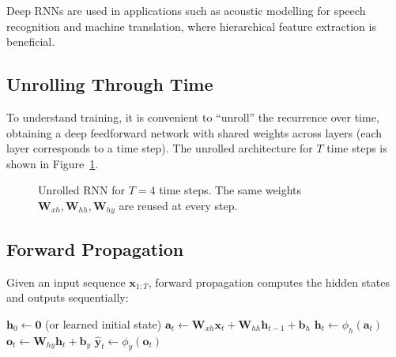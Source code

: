 \documentclass{tufte-handout}
\begin{document}
Deep RNNs are used in applications such as acoustic modelling for speech recognition and machine translation, where hierarchical feature extraction is beneficial.

\subsection{Unrolling Through Time}

To understand training, it is convenient to “unroll” the recurrence over time, obtaining a deep feedforward network with shared weights across layers (each layer corresponds to a time step). The unrolled architecture for $T$ time steps is shown in Figure~\ref{fig:rnn_unrolled}.

\begin{figure}[h]
\centering
{}
\caption{Unrolled RNN for $T=4$ time steps. The same weights $\mathbf{W}_{xh}, \mathbf{W}_{hh}, \mathbf{W}_{hy}$ are reused at every step.}
\label{fig:rnn_unrolled}
\end{figure}

\subsection{Forward Propagation}

Given an input sequence $\mathbf{x}_{1:T}$, forward propagation computes the hidden states and outputs sequentially:

\begin{algorithm}[h]
    \caption{Forward pass of an RNN}
    \begin{algorithmic}[1]
        \State $\mathbf{h}_0 \gets \mathbf{0}$ (or learned initial state)
            \State $\mathbf{a}_t \gets \mathbf{W}_{xh}\mathbf{x}_t + \mathbf{W}_{hh}\mathbf{h}_{t-1} + \mathbf{b}_h$
            \State $\mathbf{h}_t \gets \phi_h(\mathbf{a}_t)$
            \State $\mathbf{o}_t \gets \mathbf{W}_{hy}\mathbf{h}_t + \mathbf{b}_y$
            \State $\hat{\mathbf{y}}_t \gets \phi_y(\mathbf{o}_t)$
        \EndFor
    \end{algorithmic}
\end{algorithm}
\end{document}
